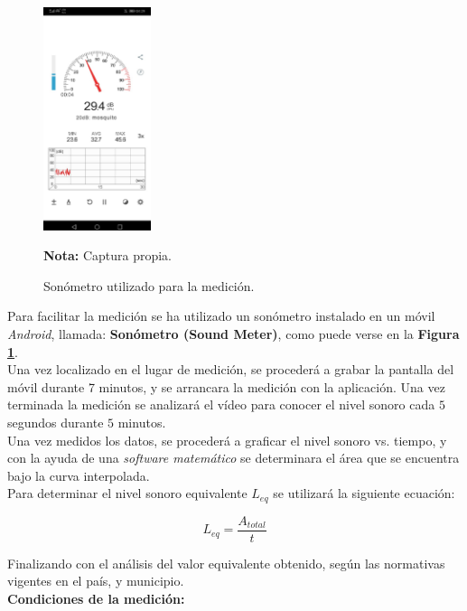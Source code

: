 \documentclass[letter,11pt]{article}
\newcommand{\source}[1]{\vspace{-11pt} \caption*{\small{\textbf{Nota:} {#1}}}}
\begin{document}
\begin{figure}
\centering
\includegraphics[width=0.28\textwidth]{resources/f4.eps}
\caption{Sonómetro utilizado para la medición.}
\label{figura4}
\source{Captura propia.}
\end{figure}

Para facilitar la medición se ha utilizado un sonómetro instalado en un móvil
\emph{Android}, llamada: \textbf{Sonómetro (Sound Meter)}, como puede verse en
la \textbf{Figura \ref{figura4}}.
\\

Una vez localizado en el lugar de medición, se procederá a grabar la pantalla
del móvil durante 7 minutos, y se arrancara la medición con la aplicación. Una
vez terminada la medición se analizará el vídeo para conocer el nivel sonoro
cada $5$ segundos durante $5$ minutos.
\\

Una vez medidos los datos, se procederá a graficar el nivel sonoro vs. tiempo, y
con la ayuda de una \emph{software matemático} se determinara el área que se
encuentra bajo la curva interpolada.
\\

Para determinar el nivel sonoro equivalente $L_{eq}$ se utilizará la siguiente
ecuación:

\begin{equation}
    L_{eq} = \frac{A_{total}}{t}
\end{equation}
\vspace{0.10cm}

Finalizando con el análisis del valor equivalente obtenido, según las normativas
vigentes en el país, y municipio.
\\

\textbf{Condiciones de la medición:} \\
\vspace{-0.4cm}
\end{document}
